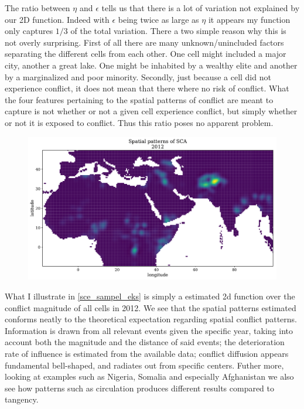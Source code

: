 \documentclass[a4paper]{article}
\begin{document}
The ratio between $\eta$ and $\epsilon$ tells us that there is a lot of variation not explained by our 2D function. Indeed with $\epsilon$ being twice as large as $\eta$ it appears my function only captures $1/3$ of the total variation. There a two simple reason why this is not overly surprising. First of all there are many unknown/unincluded factors separating the different cells from each other. One cell might included a major city, another a great lake. One might be inhabited by a wealthy elite and another by a marginalized and poor minority. Secondly, just because a cell did not experience conflict, it does not mean that there where no risk of conflict. What the four features pertaining to the spatial patterns of conflict are meant to capture is not whether or not a given cell experience conflict, but simply whether or not it is exposed to conflict. Thus this ratio poses no apparent problem.\par

\begin{figure}[!htb]
	\centering
	\includegraphics[scale=0.47]{sce_2012_samples.pdf}
    \caption{\footnotesize{}}\label{sce_sampel_eks}
\end{figure}

What I illustrate in \autoref{sce_sampel_eks} is simply a estimated 2d function over the conflict magnitude of all cells in 2012. We see that the spatial patterns estimated conforms neatly to the theoretical expectation regarding spatial conflict patterns. Information is drawn from all relevant events given the specific year, taking into account both the magnitude and the distance of said events; the deterioration rate of influence is estimated from the available data; conflict diffusion appears fundamental bell-shaped, and radiates out from specific centers. Futher more, looking at examples such as Nigeria, Somalia and especially Afghanistan we also see how patterns such as circulation produces different results compared to tangency.\par  
\end{document}
